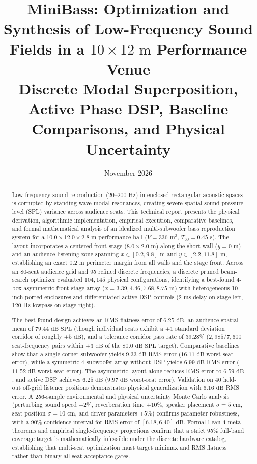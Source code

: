 \documentclass[11pt,a4paper]{article}
\title{\vspace{-1.5cm}\textbf{\LARGE MiniBass: Optimization and Synthesis of Low-Frequency Sound Fields in a $10 \times 12\text{ m}$ Performance Venue}\\[0.3em]
\Large Discrete Modal Superposition, Active Phase DSP, Baseline Comparisons, and Physical Uncertainty}
\author{}
\date{November 2026}
\begin{document}
\maketitle

\begin{abstract}
\noindent Low-frequency sound reproduction ($20\text{--}200\text{ Hz}$) in enclosed rectangular acoustic spaces is corrupted by standing wave modal resonances, creating severe spatial sound pressure level (SPL) variance across audience seats. This technical report presents the physical derivation, algorithmic implementation, empirical execution, comparative baselines, and formal mathematical analysis of an idealized multi-subwoofer bass reproduction system for a $10.0 \times 12.0 \times 2.8\text{ m}$ performance hall ($V = 336\text{ m}^3$, $T_{60} = 0.45\text{ s}$). The layout incorporates a centered front stage ($8.0 \times 2.0\text{ m}$) along the short wall ($y = 0\text{ m}$) and an audience listening zone spanning $x \in [0.2, 9.8]\text{ m}$ and $y \in [2.2, 11.8]\text{ m}$, establishing an exact $0.2\text{ m}$ perimeter margin from all walls and the stage front. Across an 80-seat audience grid and 95 refined discrete frequencies, a discrete pruned beam-search optimizer evaluated $104,145$ physical configurations, identifying a best-found 4-box asymmetric front-stage array ($x = 3.39, 4.46, 7.68, 8.75\text{ m}$) with heterogeneous 10-inch ported enclosures and differentiated active DSP controls (2 ms delay on stage-left, 120 Hz lowpass on stage-right). 

The best-found design achieves an RMS flatness error of $6.25\text{ dB}$, an audience spatial mean of $79.44\text{ dB SPL}$ (though individual seats exhibit a $\pm 1$ standard deviation corridor of roughly $\pm 5\text{ dB}$), and a tolerance corridor pass rate of $39.28\%$ ($2,985 / 7,600$ seat-frequency pairs within $\pm 3\text{ dB}$ of the $80.0\text{ dB SPL}$ target). Comparative baselines show that a single corner subwoofer yields $9.33\text{ dB}$ RMS error ($16.11\text{ dB}$ worst-seat error), while a symmetric 4-subwoofer array without DSP yields $6.99\text{ dB}$ RMS error ($11.52\text{ dB}$ worst-seat error). The asymmetric layout alone reduces RMS error to $6.59\text{ dB}$, and active DSP achieves $6.25\text{ dB}$ ($9.97\text{ dB}$ worst-seat error). Validation on 40 held-out off-grid listener positions demonstrates physical generalization with $6.16\text{ dB}$ RMS error. A 256-sample environmental and physical uncertainty Monte Carlo analysis (perturbing sound speed $\pm 2\%$, reverberation time $\pm 10\%$, speaker placement $\sigma = 5\text{ cm}$, seat position $\sigma = 10\text{ cm}$, and driver parameters $\pm 5\%$) confirms parameter robustness, with a 90\% confidence interval for RMS error of $[6.18, 6.40]\text{ dB}$. Formal Lean 4 meta-theorems and empirical single-frequency projections confirm that a strict 95\% full-band coverage target is mathematically infeasible under the discrete hardware catalog, establishing that multi-seat optimization must target minimax and RMS flatness rather than binary all-seat acceptance gates.
\end{abstract}
\end{document}
